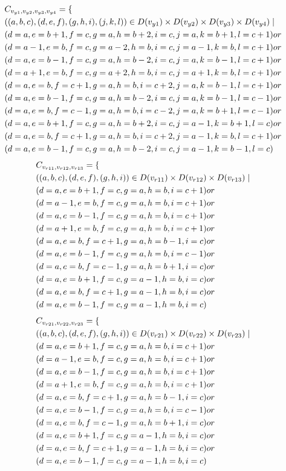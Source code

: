 \begin{align*}
&C_{v_{y1},v_{y2},v_{y3},v_{y4}}=\{\\
&((a,b,c),(d,e,f),(g,h,i),(j,k,l))\in D(v_{y1}) \times D(v_{y2})\times D(v_{y3})\times D(v_{y4})\mid\\
&(d=a ,e=b+1,f=c , g=a ,h=b+2,i=c ,j=a ,k=b+1,l=c+1)or\\
&(d=a-1,e=b ,f=c , g=a-2,h=b ,i=c ,j=a-1,k=b ,l=c+1)or\\
&(d=a ,e=b-1,f=c , g=a ,h=b-2,i=c ,j=a ,k=b-1,l=c+1)or\\
&(d=a+1,e=b ,f=c , g=a+2,h=b ,i=c ,j=a+1,k=b ,l=c+1)or\\
&(d=a ,e=b ,f=c+1, g=a ,h=b ,i=c+2,j=a ,k=b-1,l=c+1)or\\
&(d=a ,e=b-1,f=c , g=a ,h=b-2,i=c ,j=a ,k=b-1,l=c-1)or\\
&(d=a ,e=b ,f=c-1, g=a ,h=b ,i=c-2,j=a ,k=b+1,l=c-1)or\\
&(d=a ,e=b+1,f=c , g=a ,h=b+2,i=c ,j=a-1,k=b+1,l=c )or\\
&(d=a ,e=b ,f=c+1, g=a ,h=b ,i=c+2,j=a-1,k=b ,l=c+1)or\\
&(d=a ,e=b-1,f=c , g=a ,h=b-2,i=c ,j=a-1,k=b-1,l=c )
\end{align*}
\begin{align*}
&C_{v_{r11},v_{r12},v_{r13}}=\{\\
&((a,b,c),(d,e,f),(g,h,i))\in D(v_{r11}) \times D(v_{r12})\times D(v_{r13})\mid\\
&(d=a ,e=b+1,f=c , g=a ,h=b ,i=c+1)or\\
&(d=a-1,e=b ,f=c , g=a ,h=b ,i=c+1)or\\
&(d=a ,e=b-1,f=c , g=a ,h=b ,i=c+1)or\\
&(d=a+1,e=b ,f=c , g=a ,h=b ,i=c+1)or\\
&(d=a ,e=b ,f=c+1, g=a ,h=b-1,i=c )or\\
&(d=a ,e=b-1,f=c , g=a ,h=b ,i=c-1)or\\
&(d=a ,e=b ,f=c-1, g=a ,h=b+1,i=c )or\\
&(d=a ,e=b+1,f=c , g=a-1,h=b ,i=c )or\\
&(d=a ,e=b ,f=c+1, g=a-1,h=b ,i=c )or\\
&(d=a ,e=b-1,f=c , g=a-1,h=b ,i=c )
\end{align*}
\begin{align*}
&C_{v_{r21},v_{r22},v_{r23}}=\{\\
&((a,b,c),(d,e,f),(g,h,i))\in D(v_{r21}) \times D(v_{r22})\times D(v_{r23})\mid\\
&(d=a ,e=b+1,f=c , g=a ,h=b ,i=c+1)or\\
&(d=a-1,e=b ,f=c , g=a ,h=b ,i=c+1)or\\
&(d=a ,e=b-1,f=c , g=a ,h=b ,i=c+1)or\\
&(d=a+1,e=b ,f=c , g=a ,h=b ,i=c+1)or\\
&(d=a ,e=b ,f=c+1, g=a ,h=b-1,i=c )or\\
&(d=a ,e=b-1,f=c , g=a ,h=b ,i=c-1)or\\
&(d=a ,e=b ,f=c-1, g=a ,h=b+1,i=c )or\\
&(d=a ,e=b+1,f=c , g=a-1,h=b ,i=c )or\\
&(d=a ,e=b ,f=c+1, g=a-1,h=b ,i=c )or\\
&(d=a ,e=b-1,f=c , g=a-1,h=b ,i=c )
\end{align*}
